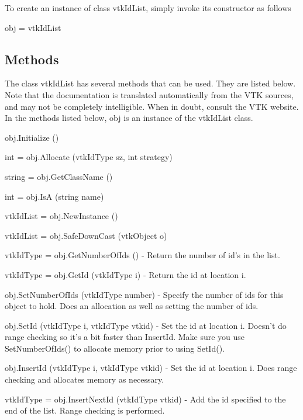To create an instance of class vtk\-Id\-List, simply invoke its constructor as follows \begin{DoxyVerb}  obj = vtkIdList
\end{DoxyVerb}
 \hypertarget{vtkwidgets_vtkxyplotwidget_Methods}{}\subsection{Methods}\label{vtkwidgets_vtkxyplotwidget_Methods}
The class vtk\-Id\-List has several methods that can be used. They are listed below. Note that the documentation is translated automatically from the V\-T\-K sources, and may not be completely intelligible. When in doubt, consult the V\-T\-K website. In the methods listed below, {\ttfamily obj} is an instance of the vtk\-Id\-List class. 
\begin{DoxyItemize}
\item {\ttfamily obj.\-Initialize ()}  
\item {\ttfamily int = obj.\-Allocate (vtk\-Id\-Type sz, int strategy)}  
\item {\ttfamily string = obj.\-Get\-Class\-Name ()}  
\item {\ttfamily int = obj.\-Is\-A (string name)}  
\item {\ttfamily vtk\-Id\-List = obj.\-New\-Instance ()}  
\item {\ttfamily vtk\-Id\-List = obj.\-Safe\-Down\-Cast (vtk\-Object o)}  
\item {\ttfamily vtk\-Id\-Type = obj.\-Get\-Number\-Of\-Ids ()} -\/ Return the number of id's in the list.  
\item {\ttfamily vtk\-Id\-Type = obj.\-Get\-Id (vtk\-Id\-Type i)} -\/ Return the id at location i.  
\item {\ttfamily obj.\-Set\-Number\-Of\-Ids (vtk\-Id\-Type number)} -\/ Specify the number of ids for this object to hold. Does an allocation as well as setting the number of ids.  
\item {\ttfamily obj.\-Set\-Id (vtk\-Id\-Type i, vtk\-Id\-Type vtkid)} -\/ Set the id at location i. Doesn't do range checking so it's a bit faster than Insert\-Id. Make sure you use Set\-Number\-Of\-Ids() to allocate memory prior to using Set\-Id().  
\item {\ttfamily obj.\-Insert\-Id (vtk\-Id\-Type i, vtk\-Id\-Type vtkid)} -\/ Set the id at location i. Does range checking and allocates memory as necessary.  
\item {\ttfamily vtk\-Id\-Type = obj.\-Insert\-Next\-Id (vtk\-Id\-Type vtkid)} -\/ Add the id specified to the end of the list. Range checking is performed.  

\end{DoxyItemize}
